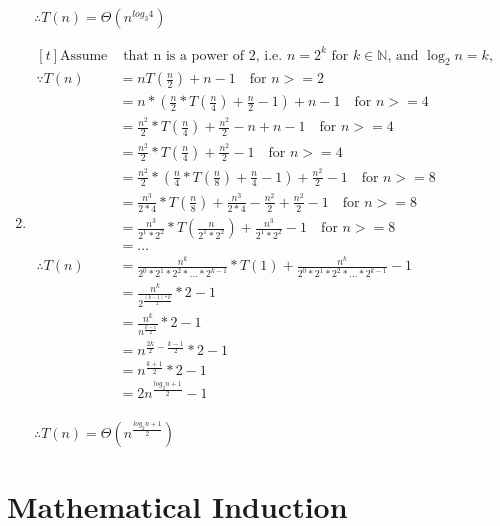 \documentclass{article}
\begin{document}
\begin{enumerate}[label=(\alph*)]
$\ \therefore T(n) = \Theta(n^{log_3 4})$

\item $\begin{aligned}[t]
\text{Assume} & \text{ that n is a power of 2, i.e. $n=2^k$ for $k \in \mathbb{N}$, and $\log_2 n = k$,}\\
\because T(n) &= nT(\frac{n}{2})+n-1 \quad \text{for $n>=2$}\\
&= n*(\frac{n}{2}*T(\frac{n}{4}) + \frac{n}{2} - 1) + n - 1 \quad \text{for $n>=4$}\\
&= \frac{n^2}{2}*T(\frac{n}{4}) + \frac{n^2}{2} - n + n - 1 \quad \text{for $n>=4$}\\
&= \frac{n^2}{2}*T(\frac{n}{4}) + \frac{n^2}{2} - 1 \quad \text{for $n>=4$}\\
&= \frac{n^2}{2}*(\frac{n}{4}*T(\frac{n}{8}) + \frac{n}{4} - 1) + \frac{n^2}{2} - 1 \quad \text{for $n>=8$}\\
&= \frac{n^3}{2*4}*T(\frac{n}{8})+\frac{n^3}{2*4} - \frac{n^2}{2} + \frac{n^2}{2} - 1 \quad \text{for $n>=8$}\\
&= \frac{n^3}{2^1*2^2}*T(\frac{n}{2^1*2^2})+\frac{n^3}{2^1*2^2} - 1 \quad \text{for $n>=8$}\\
&= \dots\\
\therefore T(n) &= \frac{n^k}{2^0*2^1*2^2*...*2^{k-1}}*T(1) + \frac{n^k}{2^0*2^1*2^2*...*2^{k-1}} - 1\\
&= \frac{n^k}{2^{\frac{(k-1)*k}{2}}}*2-1\\
&= \frac{n^k}{n^{\frac{k-1}{2}}}*2-1\\
&= n^{\frac{2k}{2}-\frac{k-1}{2}}*2-1\\
&= n^{\frac{k+1}{2}}*2-1\\
&= 2n^{\frac{log_2 n +1}{2}}-1\\
\end{aligned}$

$\ \therefore T(n) = \Theta(n^{\frac{log_2 n+1}{2}})$

\end{enumerate}

\section{Mathematical Induction}
\end{document}
